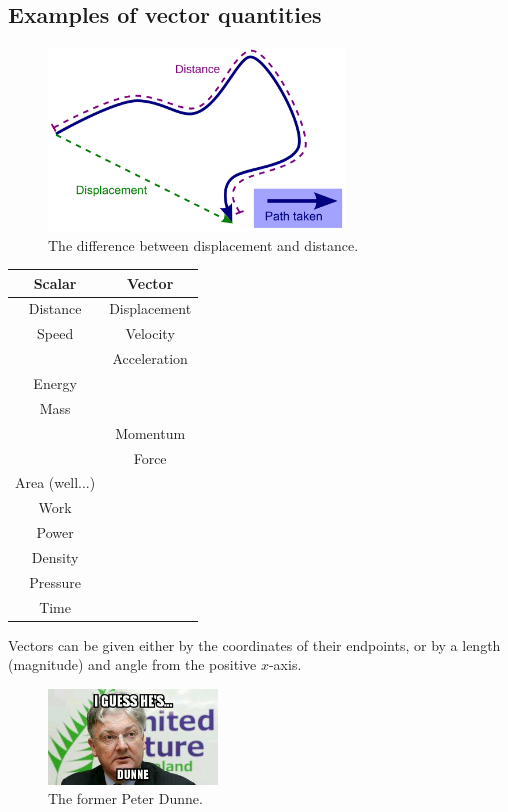 \documentclass[a4paper]{amsbook}
\begin{document}
\subsection{Examples of vector quantities}
\begin{figure}
  \centering
  \includegraphics[width=0.7\textwidth]{displacement}
  \caption{The difference between displacement and distance.\label{fig:displacement}}
\end{figure}

\begin{center}
\begin{tabular}{c|c}
  \textbf{Scalar} & \textbf{Vector}\\\hline
  Distance & Displacement\\
  Speed & Velocity\\
  & Acceleration\\
  Energy &\\
  Mass &\\
  & Momentum\\
  & Force\\
  Area (well...) &\\
  Work &\\
  Power &\\
  Density &\\
  Pressure &\\
  Time &
\end{tabular}
\end{center}

Vectors can be given either by the coordinates of their endpoints, or by a length (magnitude) and angle from the positive $ x$-axis.

\begin{figure}
  \centering
  \includegraphics[width=0.4\textwidth]{dunne}
  \caption{The former Peter Dunne.\label{fig:dunne}}
\end{figure}
\end{document}
